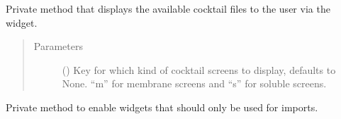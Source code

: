\documentclass[letterpaper,10pt,english]{sphinxmanual}
\begin{document}
\begin{fulllineitems}
\begin{fulllineitems}
\label{\detokenize{polo.windows:polo.windows.run_importer.RunImporterDialog._display_cocktail_files}}
Private method that displays the available cocktail files to the
user via the {\hyperref[\detokenize{polo.utils:polo.utils.io_utils.Menu}]{}}  widget.
\begin{quote}\begin{description}
\item[{Parameters}] \leavevmode
{} (\sphinxstyleliteralemphasis{\sphinxupquote{, }}) \textendash{} Key for which kind of cocktail screens to display, defaults to None. 
“m” for membrane screens and “s” for soluble screens.

\end{description}\end{quote}

\end{fulllineitems}


\begin{fulllineitems}
\label{\detokenize{polo.windows:polo.windows.run_importer.RunImporterDialog._enable_hwi_import_tools}}
Private method to enable widgets that should only be used
for  imports.

\end{fulllineitems}



\end{fulllineitems}
\end{document}

